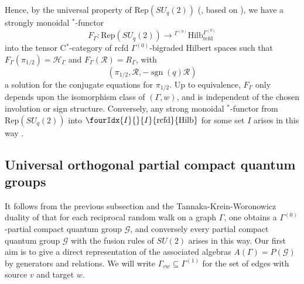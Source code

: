 \documentclass[11pt]{article}
\DeclareMathOperator{\rcf}{\mathrm{rcfd}}
\DeclareMathOperator{\sgn}{\mathrm{sgn}}
\newcommand{\Hsp}{\mathcal{H}}
\newcommand{\Hilb}{\mathrm{Hilb}}
\newcommand{\Rep}{\mathrm{Rep}}
\newcommand{\Gr}[5]{\fourIdx{#2}{#4}{#3}{#5}{#1}}%
\theoremstyle{definition}
\numberwithin{equation}{section}
\begin{document}
Hence, by the universal property of $\Rep(SU_q(2))$ (\cite[Theorem 1.4]{DCY1}, based on \cite{Tur1,EtO1,Yam1,Pin2,Pin3}), we have a strongly monoidal $^*$-functor
\begin{equation}\label{EqForget} F_{\Gamma}: \Rep(SU_q(2)) \rightarrow {}^{\Gamma^{(0)}}\Hilb_{\rcf}^{\Gamma^{(0)}}\end{equation} into the tensor C$^*$-category of rcfd $\Gamma^{(0)}$-bigraded Hilbert spaces such that $F_{\Gamma}(\pi_{1/2}) = \Hsp_{\Gamma}$ and $F_{\Gamma}(\mathscr{R}) = R_{\Gamma}$, with \[(\pi_{1/2},\mathscr{R},-\sgn(q)\mathscr{R})\] a solution for the conjugate equations for $\pi_{1/2}$. Up to equivalence, $F_{\Gamma}$ only depends upon the isomorphism class of $(\Gamma,w)$, and is independent of the chosen involution or sign structure. Conversely, any strong monoidal $^*$-functor from $\Rep(SU_q(2))$ into $\Gr{\Hilb}{I}{I}{}{\rcf}$ for some set $I$ arises in this way \cite{DCY2}.

\subsection{Universal orthogonal partial compact quantum groups}


It follows from the previous subsection and the Tannaka-Krein-Woronowicz duality of \cite[Theorem 4.14]{DCT1} that for each reciprocal random walk on a graph $\Gamma$, one obtains a $\Gamma^{(0)}$-partial compact quantum group $\mathscr{G}$, and conversely every partial compact quantum group $\mathscr{G}$ with the fusion rules of $SU(2)$ arises in this way. Our first aim is to give a direct representation of the associated algebras $A(\Gamma) = P(\mathscr{G})$ by generators and relations. We will write $\Gamma_{vw}\subseteq \Gamma^{(1)}$ for the set of edges with source $v$ and target $w$.
\end{document}
